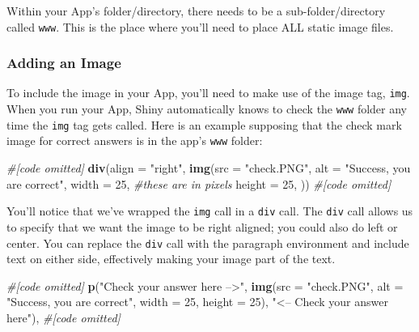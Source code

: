 \documentclass[
]{book}
\newenvironment{Shaded}{\begin{snugshade}}{\end{snugshade}}
\newcommand{\CommentTok}[1]{\textcolor[rgb]{0.56,0.35,0.01}{\textit{#1}}}
\newcommand{\DataTypeTok}[1]{\textcolor[rgb]{0.13,0.29,0.53}{#1}}
\newcommand{\DecValTok}[1]{\textcolor[rgb]{0.00,0.00,0.81}{#1}}
\newcommand{\KeywordTok}[1]{\textcolor[rgb]{0.13,0.29,0.53}{\textbf{#1}}}
\newcommand{\NormalTok}[1]{#1}
\newcommand{\StringTok}[1]{\textcolor[rgb]{0.31,0.60,0.02}{#1}}
\begin{document}
Within your App's folder/directory, there needs to be a sub-folder/directory called \texttt{www}. This is the place where you'll need to place ALL static image files.

\hypertarget{adding-an-image}{%
\subsubsection{Adding an Image}\label{adding-an-image}}

To include the image in your App, you'll need to make use of the image tag, \texttt{img}. When you run your App, Shiny automatically knows to check the \texttt{www} folder any time the \texttt{img} tag gets called. Here is an example supposing that the check mark image for correct answers is in the app's \texttt{www} folder:

\begin{Shaded}
\begin{Highlighting}[]
\CommentTok{#[code omitted]}
\KeywordTok{div}\NormalTok{(}\DataTypeTok{align =} \StringTok{"right"}\NormalTok{,}
    \KeywordTok{img}\NormalTok{(}\DataTypeTok{src =} \StringTok{"check.PNG"}\NormalTok{,}
        \DataTypeTok{alt =} \StringTok{"Success, you are correct"}\NormalTok{,}
        \DataTypeTok{width =} \DecValTok{25}\NormalTok{, }\CommentTok{#these are in pixels}
        \DataTypeTok{height =} \DecValTok{25}\NormalTok{,}
\NormalTok{        ))}
\CommentTok{#[code omitted]}
\end{Highlighting}
\end{Shaded}

You'll notice that we've wrapped the \texttt{img} call in a \texttt{div} call. The \texttt{div} call allows us to specify that we want the image to be right aligned; you could also do left or center. You can replace the \texttt{div} call with the paragraph environment and include text on either side, effectively making your image part of the text.

\begin{Shaded}
\begin{Highlighting}[]
\CommentTok{#[code omitted]}
\KeywordTok{p}\NormalTok{(}\StringTok{"Check your answer here -->"}\NormalTok{,}
  \KeywordTok{img}\NormalTok{(}\DataTypeTok{src =} \StringTok{"check.PNG"}\NormalTok{,}
      \DataTypeTok{alt =} \StringTok{"Success, you are correct"}\NormalTok{,}
      \DataTypeTok{width =} \DecValTok{25}\NormalTok{, }\DataTypeTok{height =} \DecValTok{25}\NormalTok{),}
  \StringTok{"<-- Check your answer here"}\NormalTok{),}
\CommentTok{#[code omitted]}
\end{Highlighting}
\end{Shaded}
\end{document}
